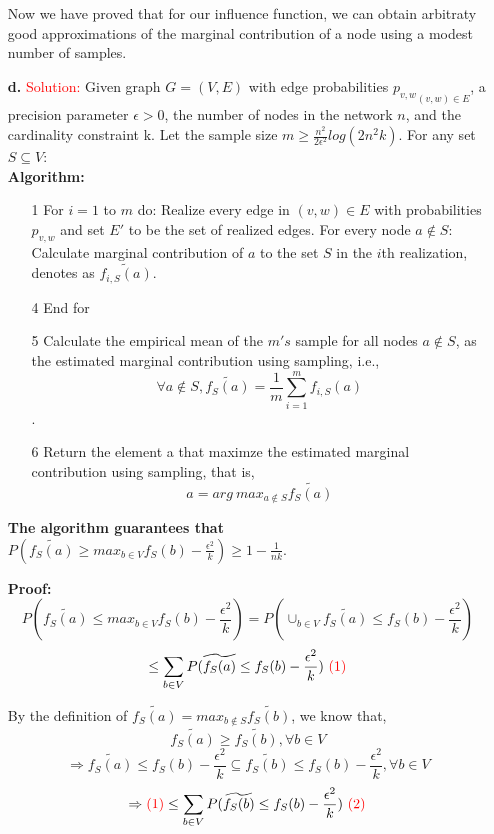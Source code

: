 \documentclass[11pt]{article} %
\begin{document}
\begin{itemize}
Now we have proved that for our influence function, we can obtain arbitraty good approximations of the marginal contribution of a node using a modest number of samples.

\item[\textbf{d.} ]  
\textcolor{red}{Solution:}
Given graph $G=(V,E)$ with edge probabilities ${p_{v,w}}_{(v,w) \in E}$, a precision parameter $\epsilon >0$, the number of nodes in the network $n$, and the cardinality constraint k. Let the sample size $m \ge \frac{n^2}{2 \epsilon^2} log(2 n^2 k) $. For any set $S \subseteq V$: \\

\textbf{Algorithm:}  
\begin{itemize}
\item[1]  For $i=1$ to $m$ do: 
	\subitem[2] Realize every edge in $(v,w) \in E$ with probabilities $p_{v,w} $ and set $E'$ to be the set of realized edges.
	\subitem[3] For every node $a \notin S$: Calculate marginal contribution of $a$ to the set $S$ in the $i$th realization, denotes as $\widetilde{f_{i,S}(a)}$.
\item[4] End for
\item[5] Calculate the empirical mean of the $m's$ sample for all nodes $a \notin S$, as the estimated marginal contribution using sampling, i.e., $$ \forall a \notin S, \widetilde{f_S(a)}=\frac{1}{m} \sum_{i=1}^{m} f_{i,S}(a)$$.
\item[6]  Return the element a that maximze the estimated marginal contribution using sampling, that is, $$a= arg \ max _{a \notin S} \widetilde{f_{S}(a)}$$
\end{itemize}

\textbf{The algorithm guarantees that $P( \widetilde{f_S(a)} \ge max_{b \in V} f_S(b) - \frac{\epsilon^2}{k} ) \ge 1-\frac{1}{nk}$}.

\textbf{Proof:} 
$$P( \widetilde{f_S(a)} \le max_{b \in V} f_S(b) - \frac{\epsilon^2}{k} ) =P( \cup_{b \in V} {\widetilde{f_S(a)}  \le  f_S(b) - \frac{\epsilon^2}{k}} )  $$
$$ \le \sum_{b\in V} P( \widetilde{f_S(a)}  \le  f_S(b) - \frac{\epsilon^2}{k}) \        \textcolor{red}{(1)} $$
 
By the definition of $\widetilde{f_{S}(a)} = max _{b \notin S} \widetilde{f_{S}(b)}$, we know that, 
$$ \widetilde{f_{S}(a)}  \ge \widetilde{f_{S}(b)}, \forall b\in V $$
$$ \Rightarrow {\widetilde{f_S(a)} \le  f_S(b) - \frac{\epsilon^2}{k}} \subseteq {\widetilde{f_S(b)} \le  f_S(b) - \frac{\epsilon^2}{k}}, \forall b \in V $$
$$ \Rightarrow  \textcolor{red}{(1)} \le \sum_{b\in V} P(\widetilde{f_S(b)} \le  f_S(b) - \frac{\epsilon^2}{k}) \         \textcolor{red}{(2)}$$


\end{itemize}
\end{document}
